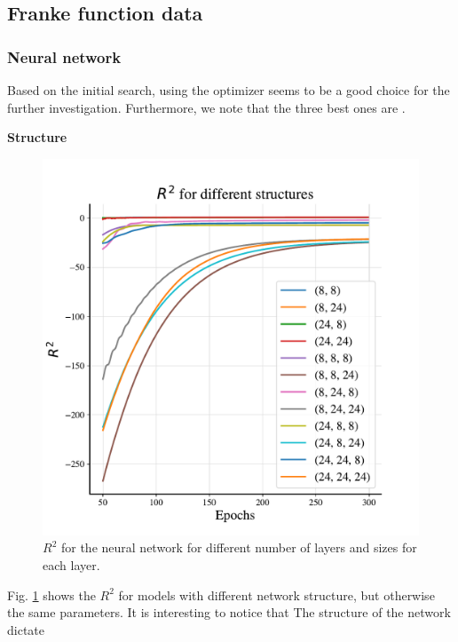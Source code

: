 \subsection{Franke function data}

\subsubsection{Neural network}

Based on the initial search, using the  optimizer seems to be a good choice for the further investigation.
Furthermore, we note that the three best ones are . 

\textbf{Structure}

\begin{figure}
    \centering
    \includegraphics[width=1.0\linewidth]{project_2/figures/$R^2$ for different structures_continuous.pdf}
    \caption{$R^2$ for the neural network for different number of layers and sizes for each layer.}
    \label{fig:structure_franke}
\end{figure}

Fig. \ref{fig:structure_franke} shows the $R^2$ for models with different network structure, but otherwise the same parameters. It is interesting to notice that 
The structure of the network dictate 

